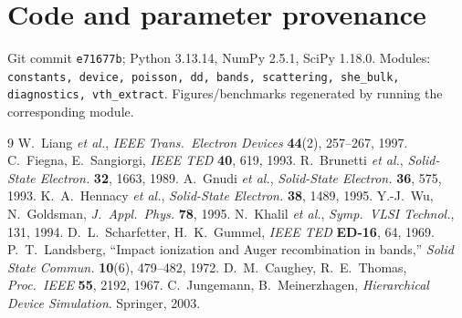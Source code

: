 \documentclass[11pt]{article}
\begin{document}
\section{Code and parameter provenance}\label{sec:provenance}
Git commit \texttt{e71677b}; Python 3.13.14, NumPy 2.5.1, SciPy 1.18.0. Modules:
\texttt{constants, device, poisson, dd, bands, scattering, she\_bulk, diagnostics,
vth\_extract}. Figures/benchmarks regenerated by running the corresponding module.

\begin{thebibliography}{9}\small
{} W.~Liang \emph{et al.}, \emph{IEEE Trans.\ Electron Devices} \textbf{44}(2),
257--267, 1997.
 C.~Fiegna, E.~Sangiorgi, \emph{IEEE TED} \textbf{40}, 619, 1993.
 R.~Brunetti \emph{et al.}, \emph{Solid-State Electron.} \textbf{32}, 1663,
1989.
 A.~Gnudi \emph{et al.}, \emph{Solid-State Electron.} \textbf{36}, 575, 1993.
 K.~A.~Hennacy \emph{et al.}, \emph{Solid-State Electron.} \textbf{38}, 1489,
1995.
 Y.-J.~Wu, N.~Goldsman, \emph{J.\ Appl.\ Phys.} \textbf{78}, 1995.
 N.~Khalil \emph{et al.}, \emph{Symp.\ VLSI Technol.}, 131, 1994.
 D.~L.~Scharfetter, H.~K.~Gummel, \emph{IEEE TED} \textbf{ED-16}, 64, 1969.
 P.~T.~Landsberg, ``Impact ionization and Auger recombination in bands,''
\emph{Solid State Commun.} \textbf{10}(6), 479--482, 1972.
 D.~M.~Caughey, R.~E.~Thomas, \emph{Proc.\ IEEE} \textbf{55}, 2192, 1967.
 C.~Jungemann, B.~Meinerzhagen, \emph{Hierarchical Device Simulation}.
Springer, 2003.
\end{thebibliography}
\end{document}
